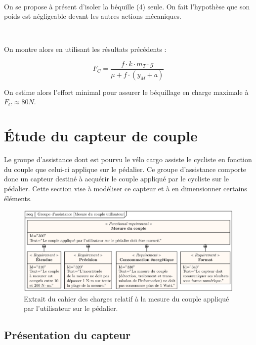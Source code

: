 ~\

On se propose à présent d'isoler la béquille (4) seule. On fait l'hypothèse que son poids est négligeable devant les autres actions mécaniques.


~\

On montre alors en utilisant les résultats précédents :

$$F_C=\dfrac{f\cdot k\cdot m_T\cdot g}{\mu+f\cdot (y_M+a)}$$

On estime alors l'effort minimal pour assurer le béquillage en charge maximale à $F_C\approx 80 N$.


\section{Étude du capteur de couple}

Le groupe d'assistance dont est pourvu le vélo cargo assiste le cycliste en fonction du couple que celui-ci
applique sur le pédalier. Ce groupe d'assistance comporte donc un capteur destiné à acquérir le couple appliqué
par le cycliste sur le pédalier. Cette section vise à modéliser ce capteur et à en dimensionner certains éléments.

\begin{figure}[ht!]
\begin{center}
\includegraphics[width=.8\linewidth]{img/fig06}
\caption{\label{fig06}Extrait du cahier des charges relatif à la mesure du couple appliqué par l'utilisateur sur le pédalier.}
\end{center}
\end{figure}

\subsection{Présentation du capteur}

